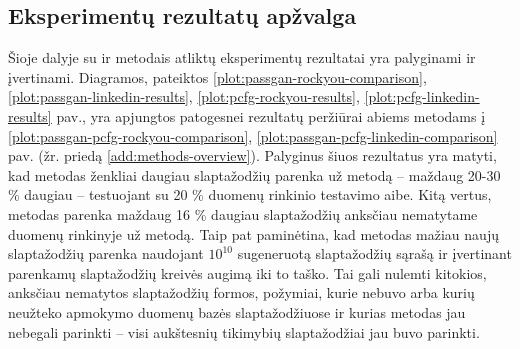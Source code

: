 \documentclass{VUMIFInfBakalaurinis}
\begin{document}
\subsection{Eksperimentų rezultatų apžvalga}
Šioje dalyje su  ir  metodais atliktų
eksperimentų rezultatai yra palyginami ir įvertinami. Diagramos, pateiktos 
\ref{plot:passgan-rockyou-comparison}, \ref{plot:passgan-linkedin-results}, 
\ref{plot:pcfg-rockyou-results}, \ref{plot:pcfg-linkedin-results} pav., yra 
apjungtos patogesnei rezultatų peržiūrai abiems metodams į 
\ref{plot:passgan-pcfg-rockyou-comparison}, 
\ref{plot:passgan-pcfg-linkedin-comparison} pav. (žr. priedą
\ref{add:methods-overview}). Palyginus šiuos rezultatus yra matyti, kad 
 metodas ženkliai daugiau slaptažodžių parenka už 
 metodą -- maždaug 20-30 \% daugiau -- testuojant su 20 \% 
 duomenų rinkinio testavimo aibe. Kitą vertus, 
 metodas parenka maždaug 16 \% daugiau slaptažodžių anksčiau 
nematytame  duomenų rinkinyje už  metodą.
Taip pat paminėtina, kad  metodas mažiau naujų slaptažodžių 
parenka naudojant $10^{10}$ sugeneruotą slaptažodžių sąrašą ir įvertinant 
parenkamų slaptažodžių kreivės augimą iki to taško. Tai gali nulemti kitokios, 
anksčiau nematytos slaptažodžių formos, požymiai, kurie nebuvo arba kurių 
neužteko apmokymo duomenų bazės slaptažodžiuose ir kurias metodas jau nebegali 
parinkti -- visi aukštesnių tikimybių slaptažodžiai jau buvo parinkti.
\end{document}
